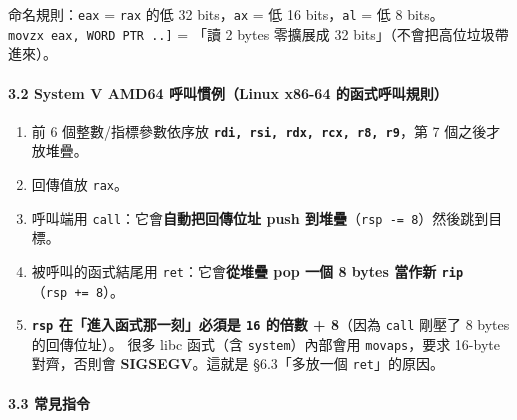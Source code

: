\documentclass[10pt,a4paper]{article}
\providecommand{\tightlist}{%
  \setlength{\itemsep}{0pt}\setlength{\parskip}{0pt}}
\begin{document}
命名規則：\texttt{eax} = \texttt{rax} 的低 32 bits，\texttt{ax} = 低 16
bits，\texttt{al} = 低 8 bits。
\texttt{movzx\ \allowbreak{}eax,\allowbreak{}\ \allowbreak{}WORD\ \allowbreak{}PTR\ \allowbreak{}{[}..{]}} = 「讀 2 bytes 零擴展成 32
bits」（不會把高位垃圾帶進來）。

\paragraph{3.2 System V AMD64 呼叫慣例（Linux x86-64
的函式呼叫規則）}\label{system-v-amd64-ux547cux53ebux6163ux4f8blinux-x86-64-ux7684ux51fdux5f0fux547cux53ebux898fux5247}

\begin{enumerate}
\def\labelenumi{\arabic{enumi}.}
\tightlist
\item
  前 6 個整數/指標參數依序放
  \textbf{\texttt{rdi,\allowbreak{}\ \allowbreak{}rsi,\allowbreak{}\ \allowbreak{}rdx,\allowbreak{}\ \allowbreak{}rcx,\allowbreak{}\ \allowbreak{}r8,\allowbreak{}\ \allowbreak{}r9}}，第 7
  個之後才放堆疊。
\item
  回傳值放 \texttt{rax}。
\item
  呼叫端用 \texttt{call}：它會\textbf{自動把回傳位址 push
  到堆疊}（\texttt{rsp\ \allowbreak{}-=\ \allowbreak{}8}）然後跳到目標。
\item
  被呼叫的函式結尾用 \texttt{ret}：它會\textbf{從堆疊 pop 一個 8 bytes
  當作新 \texttt{rip}}（\texttt{rsp\ \allowbreak{}+=\ \allowbreak{}8}）。
\item
  \textbf{\texttt{rsp} 在「進入函式那一刻」必須是 \texttt{16} 的倍數 +
  8}（因為 \texttt{call} 剛壓了 8 bytes 的回傳位址）。 很多 libc
  函式（含 \texttt{system}）內部會用 \texttt{movaps}，要求 16-byte
  對齊，否則會 \textbf{SIGSEGV}。這就是 §6.3「多放一個
  \texttt{ret}」的原因。
\end{enumerate}

\paragraph{3.3 常見指令}\label{ux5e38ux898bux6307ux4ee4}
\end{document}
